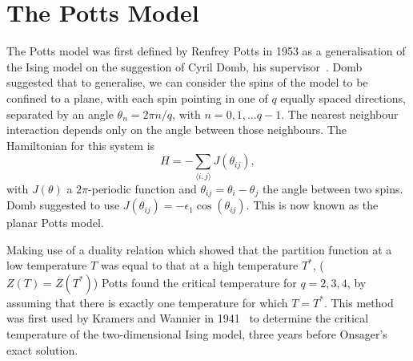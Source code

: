 \documentclass[11pt, a4paper]{report} %
\begin{document}
\section{The Potts Model}
The Potts model was first defined by Renfrey Potts in 1953 as a generalisation of the Ising model on the suggestion of Cyril Domb, his supervisor~\cite{potts:1952}.
Domb suggested that to generalise, we can consider the spins of the model to be confined to a plane, with each spin pointing in one of \(q\) equally spaced directions, separated by an angle \(\theta_n = 2\pi n /q\), with \(n = 0, 1, \ldots q - 1\).
The nearest neighbour interaction depends only on the angle between those neighbours.
The Hamiltonian for this system is
\begin{equation}
	H = - \sum_{\langle i, j \rangle} J(\theta_{ij}),
\end{equation}
with \(J(\theta)\) a \(2\pi\)-periodic function and \(\theta_{ij} = \theta_i - \theta_j\) the angle between two spins.
Domb suggested to use \(J(\theta_{ij}) = - \epsilon_1\cos(\theta_{ij})\).
This is now known as the planar Potts model.\cite{wu:1982}

Making use of a duality relation which showed that the partition function at a low temperature \(T\) was equal to that at a high temperature \(T^*\), (\(Z(T)=Z(T^*)\)) Potts found the critical temperature for \(q=2, 3, 4\), by assuming that there is exactly one temperature for which \(T=T^*\).
This method was first used by Kramers and Wannier in 1941~\cite{kramers:1941} to determine the critical temperature of the two-dimensional Ising model, three years before Onsager's exact solution.
\end{document}
